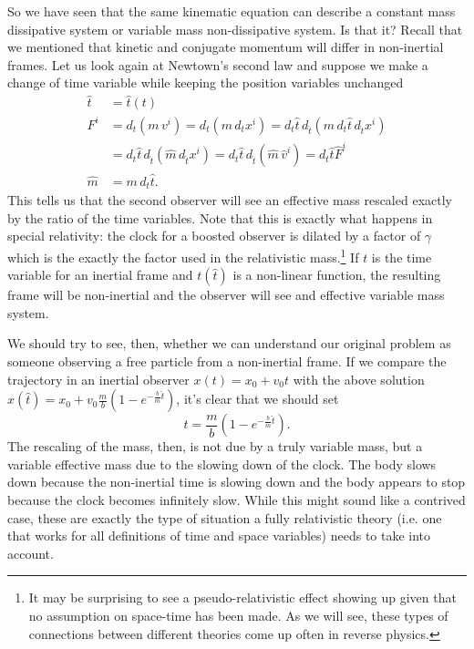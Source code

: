 So we have seen that the same kinematic equation can describe a constant mass dissipative system or variable mass non-dissipative system. Is that it? Recall that we mentioned that kinetic and conjugate momentum will differ in non-inertial frames. Let us look again at Newtown's second law and suppose we make a change of time variable while keeping the position variables unchanged
\begin{equation}
	\begin{aligned}
		\hat{t}&=\hat{t}(t) \\
		F^i &= d_t  (m \, v^i) = d_t  (m \, d_t x^i) = d_t \hat{t} \, d_{\hat{t}}  (m \, d_t \hat{t} \, d_{\hat{t}} x^i) \\ &= d_t \hat{t} \, d_{\hat{t}}  (\hat{m} \, d_{\hat{t}} x^i) = d_t \hat{t} \, d_{\hat{t}}  (\hat{m} \, \hat{v}^i) = d_t \hat{t} \hat{F}^i \\
		\hat{m} &= m \, d_t \hat{t}.
	\end{aligned}
\end{equation}
This tells us that the second observer will see an effective mass rescaled exactly by the ratio of the time variables. Note that this is exactly what happens in special relativity: the clock for a boosted observer is dilated by a factor of $\gamma$ which is the exactly the factor used in the relativistic mass.\footnote{It may be surprising to see a pseudo-relativistic effect showing up given that no assumption on space-time has been made. As we will see, these types of connections between different theories come up often in reverse physics.} If $t$ is the time variable for an inertial frame and $t(\hat{t})$ is a non-linear function, the resulting frame will be non-inertial and the observer will see and effective variable mass system.

We should try to see, then, whether we can understand our original problem as someone observing a free particle from a non-inertial frame. If we compare the trajectory in an inertial observer $x(t) = x_0 + v_0 t$ with the above solution $x(\hat{t}) = x_0 + v_0 \frac{m}{b}\left(1-e^{-\frac{b}{m}\hat{t}}\right)$, it's clear that we should set
\begin{equation}
	t = \frac{m}{b} \left(1-e^{-\frac{b}{m}\hat{t}}\right).
\end{equation}
The rescaling of the mass, then, is not due by a truly variable mass, but a variable effective mass due to the slowing down of the clock. The body slows down because the non-inertial time is slowing down and the body appears to stop because the clock becomes infinitely slow. While this might sound like a contrived case, these are exactly the type of situation a fully relativistic theory (i.e. one that works for all definitions of time and space variables) needs to take into account.

